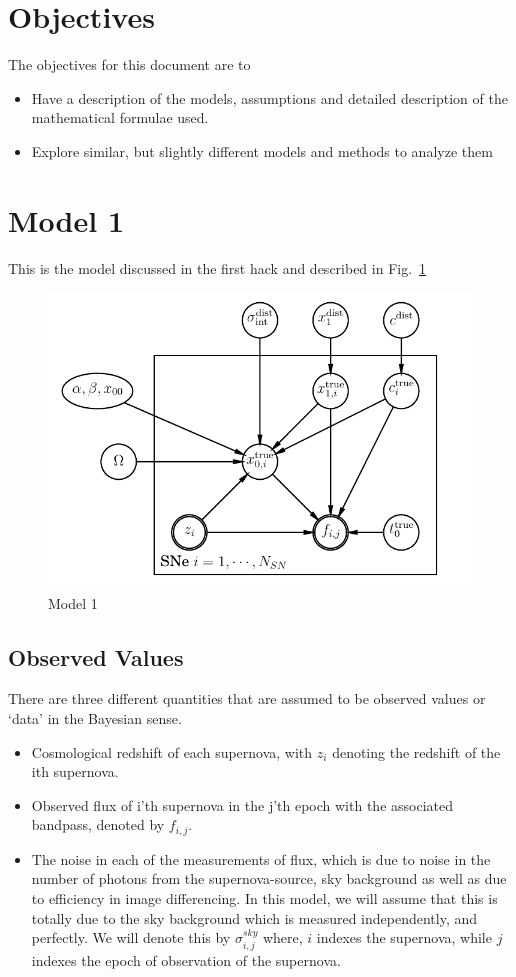 \documentclass{article}[10pt]
\begin{document}
\section{Objectives}
The objectives for this document are to
\begin{itemize}
\item Have a description of the models, assumptions and detailed description of the mathematical formulae used. 
\item Explore similar, but slightly different models and methods to analyze them\end{itemize} 

\section{Model 1}
This is the model discussed in the first hack and described in Fig.~\ref{fig:model1} 
\begin{figure}[h]
\includegraphics{images/snpgm}
\caption{Model 1}
\label{fig:model1}
\end{figure}

\subsection{Observed Values}
There are three different quantities that are assumed to be observed values or 
`data' in the Bayesian sense.
\begin{itemize}
\item Cosmological redshift of each supernova, with $z_i$ denoting the redshift of the ith supernova.
\item Observed flux of i'th supernova in the j'th epoch with the associated bandpass, denoted by $f_{i,j}$.
\item The noise in each of the measurements of flux, which is due to noise in the number of photons from
the supernova-source, sky background as well as due to efficiency in image differencing. In this model, we will assume that this is totally due to the sky background which is measured independently, and perfectly. We will denote this by 
$\sigma^{sky}_{i,j}$ where, $i$ indexes the supernova, while $j$ indexes the epoch of observation of the supernova. 
\end{itemize}
\end{document}
